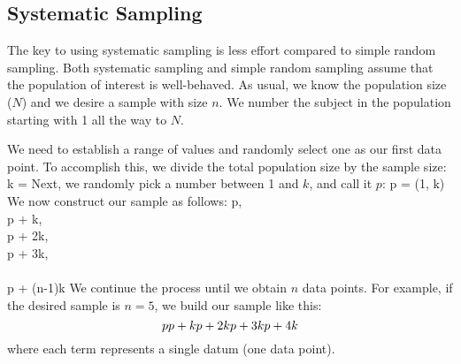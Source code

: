 \subsection{Systematic Sampling}

The key to using systematic sampling is less effort compared to simple random sampling. Both systematic sampling and simple random sampling assume that the population of interest is well-behaved. As usual, we know the population size ($N$) and we desire a sample with size $n$. We number the subject in the population starting with 1 all the way to $N$. 

We need to establish a range of values and randomly select one as our first data point. To accomplish this, we divide the total population size by the sample size:
\eq \label{upper-limit-key}
k =  
\ed 
Next, we randomly pick a number between 1 and $k$, and call it $p$: 
\eq \label{first-data}
p = {}(1, k) 
\ed 
We now construct our sample as follows: 
\eq 
p, \\
p + k, \\
p + 2k, \\
p + 3k, \\
\cdots \\
p + (n-1)k
\ed
We continue the process until we obtain $n$ data points. For example, if the desired sample is $n=5$, we build our sample like this: 
\[ 
p \\
p + k \\
p + 2k \\
p + 3k \\
p + 4k 
\]   
where each term represents a single datum (one data point). 
